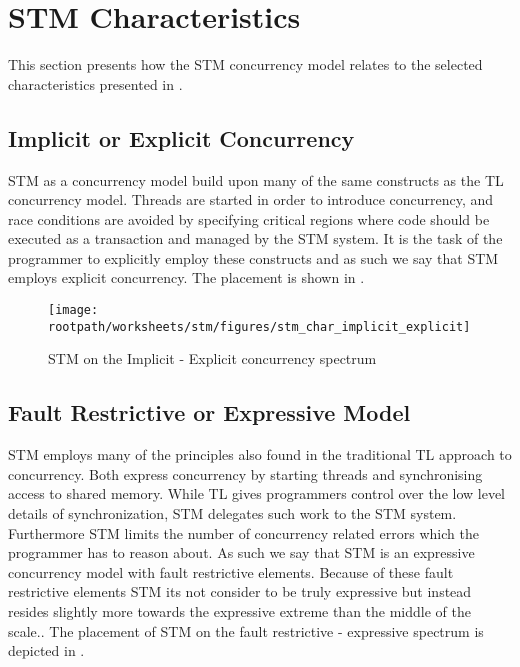 \section{\acs{STM} Characteristics}
\label{sec:stm_eval}
This section presents how the \ac{STM} concurrency model relates to the selected characteristics presented in . 

\subsection{Implicit or Explicit Concurrency}
\ac{STM} as a concurrency model build upon many of the same constructs as the \ac{TL} concurrency model. Threads are started in order to introduce concurrency, and race conditions are avoided by specifying critical regions where code should be executed as a transaction and managed by the \ac{STM} system. It is the task of the programmer to explicitly employ these constructs and as such we say that \ac{STM} employs explicit concurrency. The placement is shown in .

\begin{figure}[htbp]
\centering
 \texttt{[image: \\rootpath/worksheets/stm/figures/stm\_char\_implicit\_explicit]} 
 \caption{\ac{STM} on the Implicit - Explicit concurrency spectrum}
\label{fig:stm_char_impli_expli}
\end{figure}

\subsection{Fault Restrictive or Expressive Model}
\ac{STM} employs many of the principles also found in the traditional \ac{TL} approach to concurrency. Both express concurrency by starting threads and synchronising access to shared memory. While \ac{TL} gives programmers control over the low level details of synchronization, \ac{STM} delegates such work to the \ac{STM} system. Furthermore \ac{STM} limits the number of concurrency related errors which the programmer has to reason about. As such we say that \ac{STM} is an expressive concurrency model with fault restrictive elements. Because of these fault restrictive elements \ac{STM} its not consider to be truly expressive but instead resides slightly more towards the expressive extreme than the middle of the scale.. The placement of \ac{STM} on the fault restrictive - expressive spectrum is depicted in .

